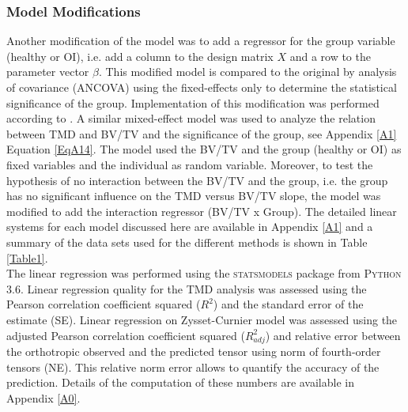 \documentclass[a4paper,fleqn]{DC_ArtStyle}
\begin{document}
	\subsubsection{Model Modifications}
	Another modification of the model was to add a regressor for the group variable (healthy or OI), i.e. add a column to the design matrix $X$ and a row to the parameter vector $\beta$. This modified model is compared to the original by analysis of covariance (ANCOVA) using the fixed-effects only to determine the statistical significance of the group. Implementation of this modification was performed according to \cite{Fox2016}. A similar mixed-effect model was used to analyze the relation between TMD and BV/TV and the significance of the group, see Appendix \ref{A1} Equation \ref{EqA14}. The model used the BV/TV and the group (healthy or OI) as fixed variables and the individual as random variable. Moreover, to test the hypothesis of no interaction between the BV/TV and the group, i.e. the group has no significant influence on the TMD versus BV/TV slope, the model was modified to add the interaction regressor (BV/TV x Group). The detailed linear systems for each model discussed here are available in Appendix \ref{A1} and a summary of the data sets used for the different methods is shown in Table \ref{Table1}.\\
	
	The linear regression was performed using the \textsc{statsmodels} package from \textsc{Python 3.6}. Linear regression quality for the TMD analysis was assessed using the Pearson correlation coefficient squared ($R^2$) and the standard error of the estimate (SE). Linear regression on Zysset-Curnier model was assessed using the adjusted Pearson correlation coefficient squared ($R^2_{adj}$) and relative error between the orthotropic observed and the predicted tensor using norm of fourth-order tensors (NE). This relative norm error allows to quantify the accuracy of the prediction. Details of the computation of these numbers are available in Appendix \ref{A0}.
	
\end{document}
